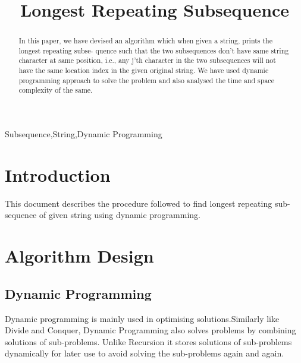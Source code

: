 \documentclass[conference]{IEEEtran}
\begin{document}
\title{Longest Repeating Subsequence \\
}

\author{
\and
{}
\and
{}

}

\maketitle

\begin{abstract}
In this paper, we have devised an algorithm which when given a string, prints the longest repeating subse- quence such that the two subsequences don’t have same string character at same position, i.e., any j’th character in the two subsequences will not have the same location index in the given original string. We have used dynamic programming approach to solve the problem and also analysed the time and space complexity of the same.
\end{abstract}

\begin{IEEEkeywords}
Subsequence,String,Dynamic Programming
\end{IEEEkeywords}

\section{Introduction}
This document describes the procedure followed to find longest repeating sub-sequence of given string using dynamic programming.

\section{Algorithm Design}

\subsection{Dynamic Programming}

Dynamic programming is mainly used in optimising solutions.Similarly like Divide and Conquer, Dynamic Programming also solves problems by combining solutions of sub-problems. Unlike Recursion it stores solutions of sub-problems dynamically for later use to avoid solving the sub-problems again and again.
\end{document}
